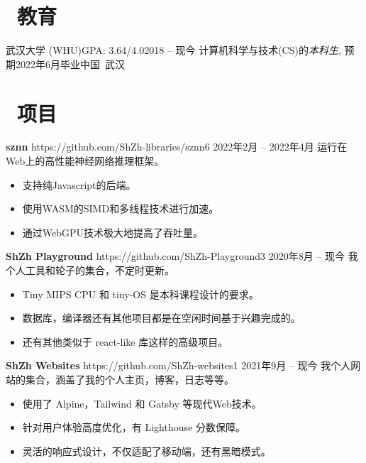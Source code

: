 \documentclass{common}
\begin{document}

\section{\faGraduationCap\ 教育}
\educationsubsection
    {武汉大学 (WHU)}{GPA: 3.64/4.0}{2018 -- 现今}
    {计算机科学与技术(CS)的\textit{本科生}, 预期2022年6月毕业}{中国\ 武汉}

\section{\faCubes\ 项目}
\projectsubsection
    {\textbf{sznn}}
    {https://github.com/ShZh-libraries/sznn}{6}
    {2022年2月 -- 2022年4月}
运行在Web上的高性能神经网络推理框架。
\begin{itemize}
    \item 支持纯Javascript的后端。
    \item 使用WASM的SIMD和多线程技术进行加速。
    \item 通过WebGPU技术极大地提高了吞吐量。
\end{itemize}
\projectsubsection
    {\textbf{ShZh Playground}}
    {https://github.com/ShZh-Playground}{3}
    {2020年8月 -- 现今}
我个人工具和轮子的集合，不定时更新。
\begin{itemize}
    \item Tiny MIPS CPU 和 tiny-OS 是本科课程设计的要求。
    \item 数据库，编译器还有其他项目都是在空闲时间基于兴趣完成的。
    \item 还有其他类似于 react-like 库这样的高级项目。
\end{itemize}
\projectsubsection
    {\textbf{ShZh Websites}}
    {https://github.com/ShZh-websites}{1}
    {2021年9月 -- 现今}
我个人网站的集合，涵盖了我的个人主页，博客，日志等等。
\begin{itemize}
    \item 使用了 Alpine，Tailwind 和 Gatsby 等现代Web技术。
    \item 针对用户体验高度优化，有 Lighthouse 分数保障。
    \item 灵活的响应式设计，不仅适配了移动端，还有黑暗模式。
\end{itemize}
\end{document}
